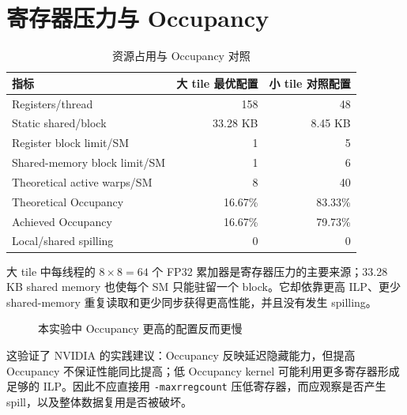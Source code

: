 \documentclass[UTF8,11pt,a4paper,fontset=fandol]{ctexart}
\newcommand{\code}[1]{\nolinkurl{#1}}
\begin{document}
\section{寄存器压力与 Occupancy}

\begin{table}[H]
\centering
\caption{资源占用与 Occupancy 对照}
\begin{tabular}{lrr}
\toprule
指标 & 大 tile 最优配置 & 小 tile 对照配置 \\
\midrule
Registers/thread & 158 & 48 \\
Static shared/block & 33.28 KB & 8.45 KB \\
Register block limit/SM & 1 & 5 \\
Shared-memory block limit/SM & 1 & 6 \\
Theoretical active warps/SM & 8 & 40 \\
Theoretical Occupancy & 16.67\% & 83.33\% \\
Achieved Occupancy & 16.67\% & 79.73\% \\
Local/shared spilling & 0 & 0 \\
\bottomrule
\end{tabular}
\end{table}

大 tile 中每线程的 $8\times8=64$ 个 FP32 累加器是寄存器压力的主要来源；33.28 KB shared memory 也使每个 SM 只能驻留一个 block。它却依靠更高 ILP、更少 shared-memory 重复读取和更少同步获得更高性能，并且没有发生 spilling。

\begin{figure}[H]
\centering
{}
\caption{本实验中 Occupancy 更高的配置反而更慢}
\label{fig:occupancy-duration}
\end{figure}

这验证了 NVIDIA 的实践建议：Occupancy 反映延迟隐藏能力，但提高 Occupancy 不保证性能同比提高；低 Occupancy kernel 可能利用更多寄存器形成足够的 ILP\cite{cuda-best-practices}。因此不应直接用 \code{-maxrregcount} 压低寄存器，而应观察是否产生 spill，以及整体数据复用是否被破坏。
\end{document}
